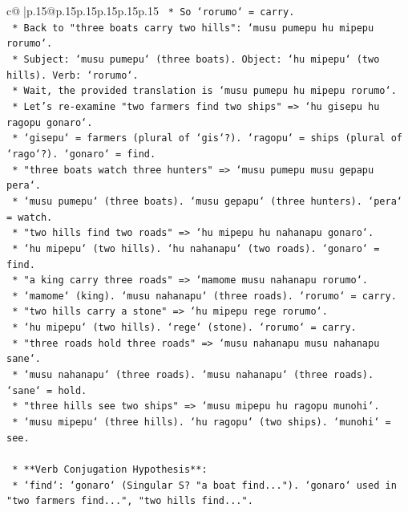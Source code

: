 \documentclass{article}
\begin{document}
{\begin{supertabular}{c@{$\;$}|p{.15\linewidth}@{}p{.15\linewidth}p{.15\linewidth}p{.15\linewidth}p{.15\linewidth}p{.15\linewidth}}
{{{\texttt{        *   So `rorumo` = carry.} \\
\texttt{        *   Back to "three boats carry two hills": `musu pumepu hu mipepu rorumo`.} \\
\texttt{        *   Subject: `musu pumepu` (three boats). Object: `hu mipepu` (two hills). Verb: `rorumo`.} \\
\texttt{        *   Wait, the provided translation is `musu pumepu hu mipepu rorumo`.} \\
\texttt{        *   Let's re{-}examine "two farmers find two ships" => `hu gisepu hu ragopu gonaro`.} \\
\texttt{        *   `gisepu` = farmers (plural of `gis`?). `ragopu` = ships (plural of `rago`?). `gonaro` = find.} \\
\texttt{        *   "three boats watch three hunters" => `musu pumepu musu gepapu pera`.} \\
\texttt{        *   `musu pumepu` (three boats). `musu gepapu` (three hunters). `pera` = watch.} \\
\texttt{        *   "two hills find two roads" => `hu mipepu hu nahanapu gonaro`.} \\
\texttt{        *   `hu mipepu` (two hills). `hu nahanapu` (two roads). `gonaro` = find.} \\
\texttt{        *   "a king carry three roads" => `mamome musu nahanapu rorumo`.} \\
\texttt{        *   `mamome` (king). `musu nahanapu` (three roads). `rorumo` = carry.} \\
\texttt{        *   "two hills carry a stone" => `hu mipepu rege rorumo`.} \\
\texttt{        *   `hu mipepu` (two hills). `rege` (stone). `rorumo` = carry.} \\
\texttt{        *   "three roads hold three roads" => `musu nahanapu musu nahanapu sane`.} \\
\texttt{        *   `musu nahanapu` (three roads). `musu nahanapu` (three roads). `sane` = hold.} \\
\texttt{        *   "three hills see two ships" => `musu mipepu hu ragopu munohi`.} \\
\texttt{        *   `musu mipepu` (three hills). `hu ragopu` (two ships). `munohi` = see.} \\
\\ 
\texttt{    *   **Verb Conjugation Hypothesis**:} \\
\texttt{        *   `find`: `gonaro` (Singular S? "a boat find..."). `gonaro` used in "two farmers find...", "two hills find...".} \\
}}}
\end{supertabular}}
\end{document}
